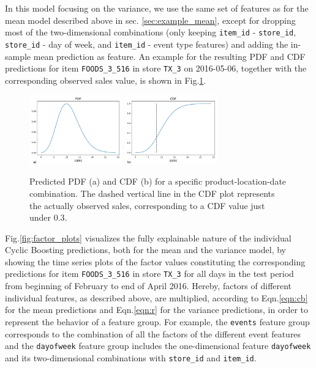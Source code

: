 \documentclass[BCOR=1mm, DIV=calc,10pt,
twoside=true,
twocolumn,
headings=normal]{scrartcl}
\newcommand{\fig}{Fig.}
\newcommand{\eqn}{Eqn.}
\begin{document}
\noindent
In this model focusing on the variance, we use the same set of features as for the mean model described above in sec. \ref{sec:example_mean}, except for dropping most of the two-dimensional combinations (only keeping \texttt{item\_id} - \texttt{store\_id}, \texttt{store\_id} - day of week, and \texttt{item\_id} - event type features) and adding the in-sample mean prediction as feature. An example for the resulting PDF and CDF predictions for item \texttt{FOODS\_3\_516} in store \texttt{TX\_3} on 2016-05-06, together with the corresponding observed sales value, is shown in \fig \ref{fig:pdf_example}.

\begin{figure}
\begin{center}
\includegraphics[width=4cm]{../figures/pdf}
\includegraphics[width=4cm]{../figures/cdf}
\caption{\label{fig:pdf_example} Predicted PDF (a) and CDF (b) for a specific product-location-date combination. The dashed vertical line in the CDF plot represents the actually observed sales, corresponding to a CDF value just under $0.3$.}
\end{center}
\end{figure}

\fig \ref{fig:factor_plots} visualizes the fully explainable nature of the individual Cyclic Boosting predictions, both for the mean and the variance model, by showing the time series plots of the factor values constituting the corresponding predictions for item \texttt{FOODS\_3\_516} in store \texttt{TX\_3} for all days in the test period from beginning of February to end of April 2016. Hereby, factors of different individual features, as described above, are multiplied, according to \eqn \eqref{eqn:cb} for the mean predictions and \eqn \eqref{eqn:r} for the variance predictions, in order to represent the behavior of a feature group. For example, the \texttt{events} feature group corresponds to the combination of all the factors of the different event features and the \texttt{dayofweek} feature group includes the one-dimensional feature \texttt{dayofweek} and its two-dimensional combinations with \texttt{store\_id} and \texttt{item\_id}.
\end{document}
